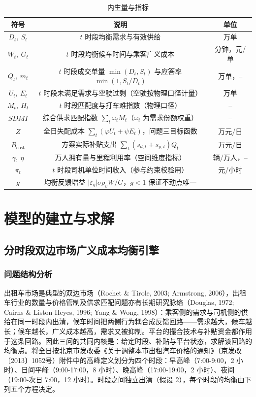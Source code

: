 \documentclass[12pt,a4paper]{ctexart}
\begin{document}
\begin{table}[H]
\centering
\caption{内生量与指标}
\label{tab:var}
\begin{tabular}{c c c}
\toprule
符号 & 说明 & 单位 \\
\midrule
$D_t,\ S_t$ & $t$ 时段均衡需求与有效供给 & 万单 \\
$W_t,\ G_t$ & $t$ 时段均衡候车时间与乘客广义成本 & 分钟，元/单 \\
$Q_t,\ m_t$ & $t$ 时段成交单量 $\min(D_t,S_t)$ 与应答率 $\min(1,S_t/D_t)$ & 万单，-- \\
$U_t,\ E_t$ & $t$ 时段未满足需求与空驶过剩（空驶按物理口径计量） & 万单 \\
$M_t,\ H_t$ & $t$ 时段匹配度与打车难指数（物理口径） & -- \\
$SDMI$ & 综合供求匹配指数 $\sum_t\omega_t M_t$（$\omega_t$ 为需求份额权重） & -- \\
$Z$ & 全日失配成本 $\sum_t(\varphi U_t+\psi E_t)$，问题三目标函数 & 万元/日 \\
$B_{\mathrm{cost}}$ & 方案实际补贴支出 $\sum_t(s_{d,t}+s_{p,t})Q_t$ & 万元/日 \\
$\gamma,\ \eta$ & 万人拥有量与里程利用率（空间维度指标） & 辆/万人，-- \\
$\pi_t$ & $t$ 时段司机单位时间收入（参与约束校验用） & 元/小时 \\
$g$ & 均衡反馈增益 $\lvert\varepsilon_g\rvert\sigma\rho_v W/G$，$g<1$ 保证不动点唯一 & -- \\
\bottomrule
\end{tabular}
\end{table}

\section{模型的建立与求解}

\subsection{分时段双边市场广义成本均衡引擎}

\subsubsection{问题结构分析}

出租车市场是典型的双边市场（Rochet \& Tirole, 2003; Armstrong, 2006），出租车行业的数量与价格管制及供求匹配问题亦有长期研究脉络（Douglas, 1972; Cairns \& Liston-Heyes, 1996; Yang \& Wong, 1998）：乘客侧的需求与司机侧的供给在同一时段内出清，候车时间把两侧行为耦合成反馈回路——需求越大，候车越长；候车越长，广义成本越高，需求又被抑制。平台的撮合技术与补贴资金都作用于这条回路。因此三问的共同内核是：给定时段、补贴与平台状态，求解该回路的均衡点。将全日按北京市发改委《关于调整本市出租汽车价格的通知》（京发改〔2013〕1052号）附件中的高峰定义划分为四个时段：早高峰（7:00-9:00，2 小时）、日间平峰（9:00-17:00，8 小时）、晚高峰（17:00-19:00，2 小时）、夜间（19:00-次日 7:00，12 小时）。时段之间独立出清（假设 2），每个时段的均衡由下列五个方程决定。
\end{document}

